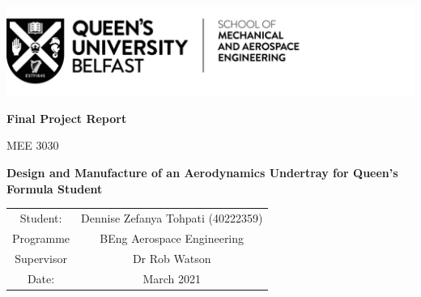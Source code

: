 \begin{titlepage}
\includegraphics[scale=1]{Figures/QUB LOGO - SMAE.png}
\centering

\vspace{4cm}
\textbf{Final Project Report}

MEE 3030

\vspace{3cm}
\textbf{Design and Manufacture of an Aerodynamics Undertray for Queen's Formula Student}


\vspace{7cm}
\begin{tabular}{cc}
    Student: &  \quad Dennise Zefanya Tohpati (40222359)\\
    Programme & \quad BEng Aerospace Engineering\\
    Supervisor & \quad Dr Rob Watson\\
    Date: & \quad 26 March 2021
    
    
\end{tabular}
\end{titlepage}
